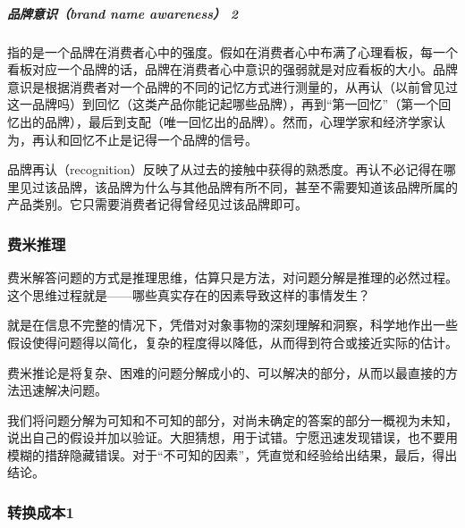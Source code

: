 \documentclass[letterpaper,11pt,english]{sphinxmanual}
\begin{document}
\subparagraph{品牌意识（brand name awareness） 2\sphinxfootnotemark[116]}
\label{\detokenize{chapter_idea/brand:brand-name-awareness-2}}%
\begin{footnotetext}[116]\sphinxAtStartFootnote
{}
%
\end{footnotetext}\ignorespaces 
指的是一个品牌在消费者心中的强度。假如在消费者心中布满了心理看板，每一个看板对应一个品牌的话，品牌在消费者心中意识的强弱就是对应看板的大小。品牌意识是根据消费者对一个品牌的不同的记忆方式进行测量的，从再认（以前曾见过这一品牌吗）到回忆（这类产品你能记起哪些品牌），再到“第一回忆”（第一个回忆出的品牌），最后到支配（唯一回忆出的品牌）。然而，心理学家和经济学家认为，再认和回忆不止是记得一个品牌的信号。

品牌再认（recognition）反映了从过去的接触中获得的熟悉度。再认不必记得在哪里见过该品牌，该品牌为什么与其他品牌有所不同，甚至不需要知道该品牌所属的产品类别。它只需要消费者记得曾经见过该品牌即可。


\subsubsection{费米推理}
\label{\detokenize{chapter_idea/decompose:id1}}\label{\detokenize{chapter_idea/decompose::doc}}
费米解答问题的方式是推理思维，估算只是方法，对问题分解是推理的必然过程。这个思维过程就是——哪些真实存在的因素导致这样的事情发生？

就是在信息不完整的情况下，凭借对对象事物的深刻理解和洞察，科学地作出一些假设使得问题得以简化，复杂的程度得以降低，从而得到符合或接近实际的估计。

费米推论是将复杂、困难的问题分解成小的、可以解决的部分，从而以最直接的方法迅速解决问题。

我们将问题分解为可知和不可知的部分，对尚未确定的答案的部分一概视为未知，说出自己的假设并加以验证。大胆猜想，用于试错。宁愿迅速发现错误，也不要用模糊的措辞隐藏错误。对于“不可知的因素”，凭直觉和经验给出结果，最后，得出结论。


\subsubsection{转换成本1\sphinxfootnotemark[117]}
\label{\detokenize{chapter_idea/convert:id1}}\label{\detokenize{chapter_idea/convert::doc}}%
\begin{footnotetext}[117]\sphinxAtStartFootnote
{}
%
\end{footnotetext}\ignorespaces 
\end{document}
